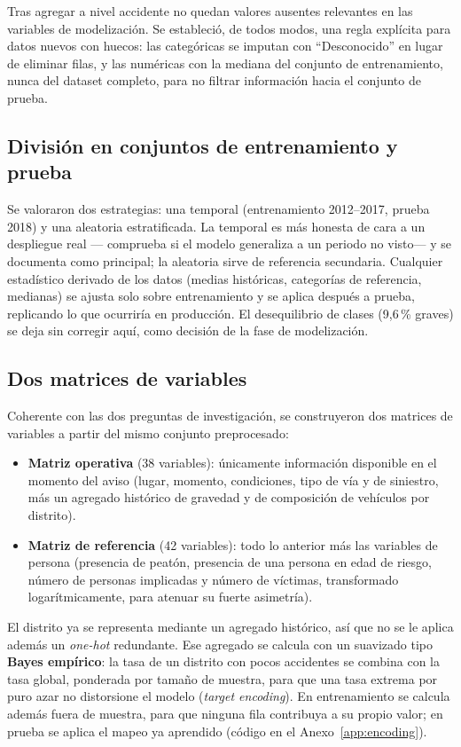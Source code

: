 \documentclass[11pt,a4paper]{article}
\begin{document}
Tras agregar a nivel accidente no quedan valores ausentes relevantes en las variables de modelización. Se estableció, de todos modos, una regla explícita para datos nuevos con huecos: las categóricas se imputan con ``Desconocido'' en lugar de eliminar filas, y las numéricas con la mediana del conjunto de entrenamiento, nunca del dataset completo, para no filtrar información hacia el conjunto de prueba.

\subsection{División en conjuntos de entrenamiento y prueba}

Se valoraron dos estrategias: una temporal (entrenamiento 2012--2017, prueba 2018) y una aleatoria estratificada. La temporal es más honesta de cara a un despliegue real --- comprueba si el modelo generaliza a un periodo no visto--- y se documenta como principal; la aleatoria sirve de referencia secundaria. Cualquier estadístico derivado de los datos (medias históricas, categorías de referencia, medianas) se ajusta solo sobre entrenamiento y se aplica después a prueba, replicando lo que ocurriría en producción. El desequilibrio de clases (9,6\,\% graves) se deja sin corregir aquí, como decisión de la fase de modelización.

\subsection{Dos matrices de variables}

Coherente con las dos preguntas de investigación, se construyeron dos matrices de variables a partir del mismo conjunto preprocesado:

\begin{itemize}
\item \textbf{Matriz operativa} (38 variables): únicamente información disponible en el momento del aviso (lugar, momento, condiciones, tipo de vía y de siniestro, más un agregado histórico de gravedad y de composición de vehículos por distrito).
\item \textbf{Matriz de referencia} (42 variables): todo lo anterior más las variables de persona (presencia de peatón, presencia de una persona en edad de riesgo, número de personas implicadas y número de víctimas, transformado logarítmicamente, para atenuar su fuerte asimetría).
\end{itemize}

El distrito ya se representa mediante un agregado histórico, así que no se le aplica además un \emph{one-hot} redundante. Ese agregado se calcula con un suavizado tipo \textbf{Bayes empírico}: la tasa de un distrito con pocos accidentes se combina con la tasa global, ponderada por tamaño de muestra, para que una tasa extrema por puro azar no distorsione el modelo (\emph{target encoding}). En entrenamiento se calcula además fuera de muestra, para que ninguna fila contribuya a su propio valor; en prueba se aplica el mapeo ya aprendido (código en el Anexo~\ref{app:encoding}).
\end{document}
